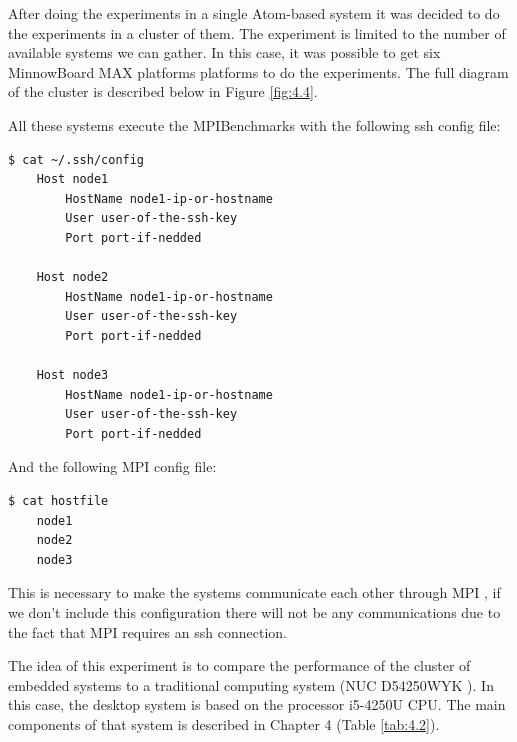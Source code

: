 After doing the experiments in a single Atom-based system it was  decided to do the
experiments in a cluster of them. The experiment is limited to the number of
available systems we can gather. In this case, it was possible to get six  MinnowBoard MAX
platforms \cite{minnowboard} platforms to do the experiments. The full diagram
of the cluster is described below in Figure \ref{fig:4.4}.

All these systems execute the MPIBenchmarks with the following ssh config file:

\begin{minipage}{\textwidth}
\end{minipage}

\begin{minipage}{\textwidth}

\begin{lstlisting}[frame=single]
  $ cat ~/.ssh/config
    Host node1
        HostName node1-ip-or-hostname
        User user-of-the-ssh-key
        Port port-if-nedded

    Host node2
        HostName node1-ip-or-hostname
        User user-of-the-ssh-key
        Port port-if-nedded

    Host node3
        HostName node1-ip-or-hostname
        User user-of-the-ssh-key
        Port port-if-nedded

\end{lstlisting}

\end{minipage}

And the following MPI config file:

\begin{minipage}{\textwidth}
\end{minipage}

\begin{minipage}{\textwidth}
\begin{lstlisting}[frame=single]
  $ cat hostfile
    node1
    node2
    node3
\end{lstlisting}

\end{minipage}

This is necessary to make the systems communicate each other through MPI , if
we don't include this configuration there will not be any communications due to
the fact that MPI requires an ssh connection. 

The idea of this experiment is to compare the performance of the cluster of
embedded systems to a traditional computing system (NUC D54250WYK \cite{NUC}).
In this case, the desktop system is based on the processor i5-4250U CPU. The
main components of that system is described in Chapter 4 (Table \ref{tab:4.2}).

